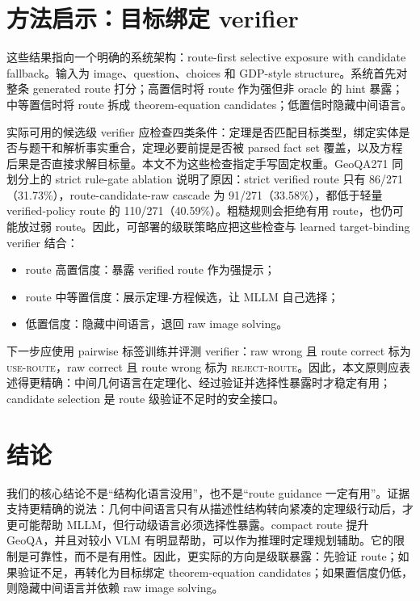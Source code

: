 \documentclass[UTF8,11pt,fontset=fandol]{ctexart}
\begin{document}
\section{方法启示：目标绑定 verifier}
这些结果指向一个明确的系统架构：route-first selective exposure with candidate fallback。输入为 image、question、choices 和 GDP-style structure。系统首先对整条 generated route 打分；高置信时将 route 作为强但非 oracle 的 hint 暴露；中等置信时将 route 拆成 theorem-equation candidates；低置信时隐藏中间语言。

实际可用的候选级 verifier 应检查四类条件：定理是否匹配目标类型，绑定实体是否与题干和解析事实重合，定理必要前提是否被 parsed fact set 覆盖，以及方程后果是否直接求解目标量。本文不为这些检查指定手写固定权重。GeoQA271 同划分上的 strict rule-gate ablation 说明了原因：strict verified route 只有 86/271（31.73\%），route-candidate-raw cascade 为 91/271（33.58\%），都低于轻量 verified-policy route 的 110/271（40.59\%）。粗糙规则会拒绝有用 route，也仍可能放过弱 route。因此，可部署的级联策略应把这些检查与 learned target-binding verifier 结合：

\begin{itemize}[leftmargin=*]
\item route 高置信度：暴露 verified route 作为强提示；
\item route 中等置信度：展示定理-方程候选，让 MLLM 自己选择；
\item 低置信度：隐藏中间语言，退回 raw image solving。
\end{itemize}

下一步应使用 pairwise 标签训练并评测 verifier：raw wrong 且 route correct 标为 \textsc{use-route}，raw correct 且 route wrong 标为 \textsc{reject-route}。因此，本文原则应表述得更精确：中间几何语言在定理化、经过验证并选择性暴露时才稳定有用；candidate selection 是 route 级验证不足时的安全接口。

\section{结论}
我们的核心结论不是“结构化语言没用”，也不是“route guidance 一定有用”。证据支持更精确的说法：几何中间语言只有从描述性结构转向紧凑的定理级行动后，才更可能帮助 MLLM，但行动级语言必须选择性暴露。compact route 提升 GeoQA，并且对较小 VLM 有明显帮助，可以作为推理时定理规划辅助。它的限制是可靠性，而不是有用性。因此，更实际的方向是级联暴露：先验证 route；如果验证不足，再转化为目标绑定 theorem-equation candidates；如果置信度仍低，则隐藏中间语言并依赖 raw image solving。

\appendix
\end{document}
